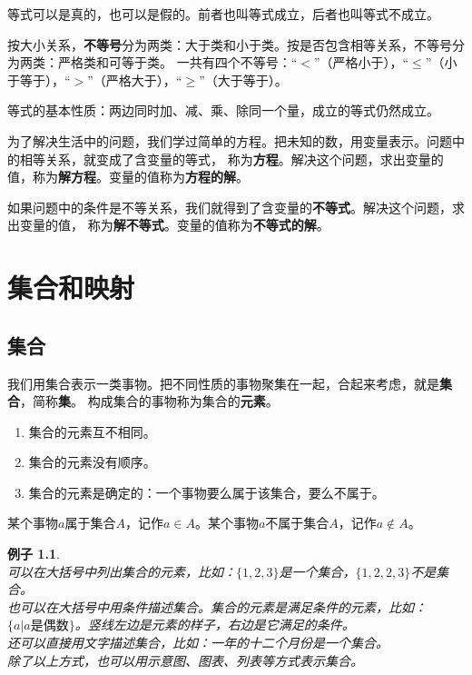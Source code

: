 \documentclass[12pt,UTF8]{ctexbook}
\newtheorem{ex}{例子}[section]
\begin{document}
等式可以是真的，也可以是假的。前者也叫等式成立，后者也叫等式不成立。

按大小关系，\textbf{不等号}分为两类：大于类和小于类。按是否包含相等关系，不等号分为两类：严格类和可等于类。
一共有四个不等号：“$<$”（严格小于），“$\leqslant$”（小于等于），“$>$”（严格大于），“$\geqslant$”（大于等于）。

等式的基本性质：两边同时加、减、乘、除同一个量，成立的等式仍然成立。

为了解决生活中的问题，我们学过简单的方程。把未知的数，用变量表示。问题中的相等关系，就变成了含变量的等式，
称为\textbf{方程}。解决这个问题，求出变量的值，称为\textbf{解方程}。变量的值称为\textbf{方程的解}。

如果问题中的条件是不等关系，我们就得到了含变量的\textbf{不等式}。解决这个问题，求出变量的值，
称为\textbf{解不等式}。变量的值称为\textbf{不等式的解}。

\chapter{集合和映射}
\section{集合}
我们用集合表示一类事物。把不同性质的事物聚集在一起，合起来考虑，就是\textbf{集合}，简称\textbf{集}。
构成集合的事物称为集合的\textbf{元素}。
\begin{enumerate}
    \item 集合的元素互不相同。
    \item 集合的元素没有顺序。
    \item 集合的元素是确定的：一个事物要么属于该集合，要么不属于。
\end{enumerate}

某个事物$a$属于集合$A$，记作$a\in A$。某个事物$a$不属于集合$A$，记作$a\notin A$。

\begin{ex}\label{ex:2-0-0}
    \mbox{} \\ 
    \indent 可以在大括号中列出集合的元素，比如：$\{1,2,3\}$是一个集合，$\{1,2,2,3\}$不是集合。 \\
    \indent 也可以在大括号中用条件描述集合。集合的元素是满足条件的元素，比如：$\{ a | a\mbox{是偶数}\}$。竖线左边是元素的样子，右边是它满足的条件。\\
    \indent 还可以直接用文字描述集合，比如：一年的十二个月份是一个集合。\\
    \indent 除了以上方式，也可以用示意图、图表、列表等方式表示集合。
\end{ex}
\end{document}

